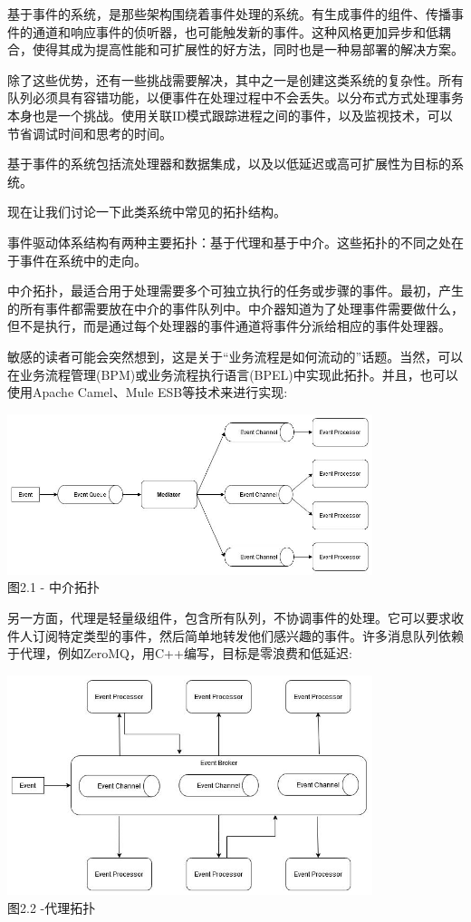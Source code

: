 
基于事件的系统，是那些架构围绕着事件处理的系统。有生成事件的组件、传播事件的通道和响应事件的侦听器，也可能触发新的事件。这种风格更加异步和低耦合，使得其成为提高性能和可扩展性的好方法，同时也是一种易部署的解决方案。

除了这些优势，还有一些挑战需要解决，其中之一是创建这类系统的复杂性。所有队列必须具有容错功能，以便事件在处理过程中不会丢失。以分布式方式处理事务本身也是一个挑战。使用关联ID模式跟踪进程之间的事件，以及监视技术，可以节省调试时间和思考的时间。

基于事件的系统包括流处理器和数据集成，以及以低延迟或高可扩展性为目标的系统。

现在让我们讨论一下此类系统中常见的拓扑结构。


事件驱动体系结构有两种主要拓扑：基于代理和基于中介。这些拓扑的不同之处在于事件在系统中的走向。

中介拓扑，最适合用于处理需要多个可独立执行的任务或步骤的事件。最初，产生的所有事件都需要放在中介的事件队列中。中介器知道为了处理事件需要做什么，但不是执行，而是通过每个处理器的事件通道将事件分派给相应的事件处理器。 

敏感的读者可能会突然想到，这是关于“业务流程是如何流动的”话题。当然，可以在业务流程管理(BPM)或业务流程执行语言(BPEL)中实现此拓扑。并且，也可以使用Apache Camel、Mule ESB等技术来进行实现:

\begin{center}
\includegraphics[width=0.8\textwidth]{content/1/chapter2/images/1.jpg}\\
图2.1 - 中介拓扑
\end{center}

另一方面，代理是轻量级组件，包含所有队列，不协调事件的处理。它可以要求收件人订阅特定类型的事件，然后简单地转发他们感兴趣的事件。许多消息队列依赖于代理，例如ZeroMQ，用C++编写，目标是零浪费和低延迟:

\begin{center}
\includegraphics[width=0.8\textwidth]{content/1/chapter2/images/2.jpg}\\
图2.2 -代理拓扑
\end{center}

